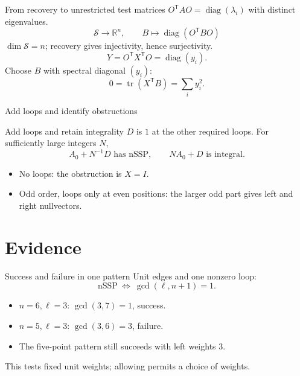 \documentclass{beamer}
\begin{document}
\begin{frame}{From recovery to unrestricted test matrices}
$O^{\mathsf T}AO=\operatorname{diag}(\lambda_i)$ with distinct eigenvalues.
\[
\mathcal S\longrightarrow\mathbb R^n,\qquad B\longmapsto\operatorname{diag}(O^{\mathsf T}BO)
\]
$\dim\mathcal S=n$; recovery gives injectivity, hence surjectivity.
\[Y=O^{\mathsf T}X^{\mathsf T}O=\operatorname{diag}(y_i).\]
Choose $B$ with spectral diagonal $(y_i)$:
\[0=\operatorname{tr}(X^{\mathsf T}B)=\sum_i y_i^2.\]
\end{frame}

\begin{frame}{Add loops and identify obstructions}
\begin{block}{Add loops and retain integrality}
$D$ is $1$ at the other required loops. For sufficiently large integers $N$,
\[ A_0+N^{-1}D\text{ has nSSP},\qquad NA_0+D\text{ is integral}.\]
\end{block}
\begin{itemize}\item No loops: the obstruction is $X=I$.
\item Odd order, loops only at even positions: the larger odd part gives left and right nullvectors.
\end{itemize}
\end{frame}

\section{Evidence}
\begin{frame}{Success and failure in one pattern}
Unit edges and one nonzero loop:
\[\text{nSSP}\ \Longleftrightarrow\ \gcd(\ell,n+1)=1.\]
\begin{itemize}\item $n=6,\ell=3$: $\gcd(3,7)=1$, success.
\item $n=5,\ell=3$: $\gcd(3,6)=3$, failure.
\item The five-point pattern still succeeds with left weights $3$.
\end{itemize}
This tests fixed unit weights; allowing permits a choice of weights.
\end{frame}
\end{document}
